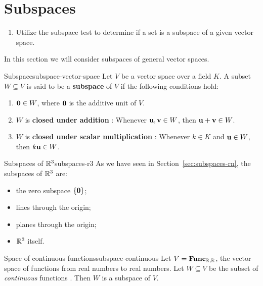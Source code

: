 \section{Subspaces}

\begin{outcome}
  \begin{enumerate}
  \item Utilize the subspace test to determine if a set is a subspace
    of a given vector space.
  \end{enumerate}
\end{outcome}

In this section we will consider subspaces of general vector spaces.

\begin{definition}{Subspace}{subspace-vector-space}
  Let $V$ be a vector space over a field $K$. A subset $W\subseteq V$
  is said to be a \textbf{subspace} of\/ $V$ if the
  following conditions hold:
  \begin{enumerate}
  \item $\mbox{\bf 0}\in W$, where $\mbox{\bf 0}$ is the additive unit of\/ $V$.
  \item $W$ is \textbf{closed under addition}%
    : Whenever $\mbox{\bf u}, \mbox{\bf v}\in W$,
    then $\mbox{\bf u} + \mbox{\bf v}\in W$.
  \item $W$ is \textbf{closed under scalar multiplication}%
    : Whenever $k\in K$ and
    $\mbox{\bf u}\in W$, then $k\mbox{\bf u}\in W$.
  \end{enumerate}
\end{definition}

\begin{example}{Subspaces of $\mathbb{R}^3$}{subspaces-r3}
  As we have seen in Section~\ref{sec:subspaces-rn}, the subspaces of
  $\mathbb{R}^3$ are:
  \begin{itemize}
  \item the zero subspace%
     $\left\{\mbox{\bf 0}\right\}$;
  \item lines through the origin;
  \item planes through the origin;
  \item $\mathbb{R}^3$ itself.
  \end{itemize}
\end{example}

\begin{example}{Space of continuous functions}{subspace-continuous}
  Let $V = \mathbf{Func}_{\mathbb{R},\mathbb{R}}$, the vector space of functions from real numbers to
  real numbers. Let $W\subseteq V$ be the subset of {\em continuous}
  functions%
  . Then $W$ is a subspace of\/ $V$.
\end{example}

